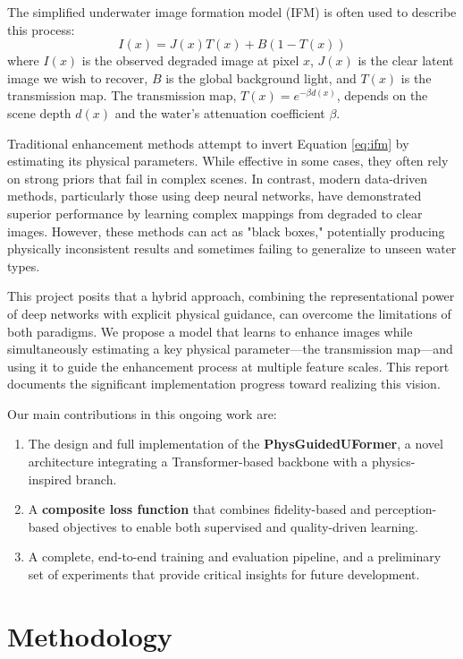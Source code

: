 \documentclass[10pt,twocolumn,letterpaper]{article}
\begin{document}
The simplified underwater image formation model (IFM) is often used to describe this process:
\begin{equation}
I(x) = J(x)T(x) + B(1 - T(x))
\label{eq:ifm}
\end{equation}
where $I(x)$ is the observed degraded image at pixel $x$, $J(x)$ is the clear latent image we wish to recover, $B$ is the global background light, and $T(x)$ is the transmission map. The transmission map, $T(x) = e^{-\beta d(x)}$, depends on the scene depth $d(x)$ and the water's attenuation coefficient $\beta$.

Traditional enhancement methods attempt to invert Equation \ref{eq:ifm} by estimating its physical parameters. While effective in some cases, they often rely on strong priors that fail in complex scenes. In contrast, modern data-driven methods, particularly those using deep neural networks, have demonstrated superior performance by learning complex mappings from degraded to clear images. However, these methods can act as "black boxes," potentially producing physically inconsistent results and sometimes failing to generalize to unseen water types.

This project posits that a hybrid approach, combining the representational power of deep networks with explicit physical guidance, can overcome the limitations of both paradigms. We propose a model that learns to enhance images while simultaneously estimating a key physical parameter—the transmission map—and using it to guide the enhancement process at multiple feature scales. This report documents the significant implementation progress toward realizing this vision.

Our main contributions in this ongoing work are:
\begin{enumerate}
    \item The design and full implementation of the \textbf{PhysGuidedUFormer}, a novel architecture integrating a Transformer-based backbone with a physics-inspired branch.
    \item A \textbf{composite loss function} that combines fidelity-based and perception-based objectives to enable both supervised and quality-driven learning.
    \item A complete, end-to-end training and evaluation pipeline, and a preliminary set of experiments that provide critical insights for future development.
\end{enumerate}

\section{Methodology}
\end{document}
